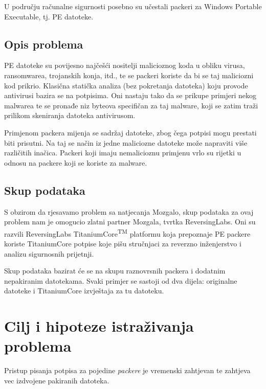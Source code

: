 \documentclass[paper=a4, fontsize=11pt]{scrartcl} %
\numberwithin{equation}{section} %
\numberwithin{figure}{section} %
\numberwithin{table}{section} %
\begin{document}
U području računalne sigurnosti posebno su učestali packeri za Windows Portable Executable, tj. PE datoteke.

\subsection{Opis problema}

PE datoteke su povijesno najčešći nositelji malicioznog koda u obliku virusa, ransomwarea,
trojanskih konja, itd., te se packeri koriste da bi se taj maliciozni kod prikrio. Klasična statička
analiza (bez pokretanja datoteka) koju provode antivirusi bazira se na potpisima. Oni nastaju
tako da se prikupe primjeri nekog malwarea te se pronađe niz byteova specifičan za taj malware, koji se zatim traži prilikom skeniranja datoteka antivirusom.


\vspace{3mm}


Primjenom packera mijenja se sadržaj datoteke, zbog čega potpisi mogu prestati biti prisutni.
Na taj se način iz jedne maliciozne datoteke može napraviti više različitih inačica. Packeri koji
imaju nemalicioznu primjenu vrlo su rijetki u odnosu na packere koji se koriste za malware.

\subsection{Skup podataka}
S obzirom da rjesavamo problem sa natjecanja Mozgalo, skup podataka za ovaj problem nam je omogucio zlatni partner Mozgala, tvrtka ReversingLabs. Oni su razvili ReversingLabs TitaniumCore\textsuperscript{TM} platformu koja prepoznaje PE packere koriste TitaniumCore potpise koje pišu stručnjaci za reverzno inženjerstvo i analizu sigurnosnih prijetnji.

\vspace{3mm}

Skup podataka bazirat će se na skupu raznovrsnih packera i dodatnim nepakiranim
datotekama. Svaki primjer se sastoji od dva dijela: originalne datoteke i TitaniumCore
izvještaja za tu datoteku.

\section{Cilj i hipoteze istraživanja problema}

Pristup pisanja potpisa za pojedine \textit{packere} je vremenski zahtjevan te zahtjeva vec izdvojene pakiranih datoteka.
\end{document}
